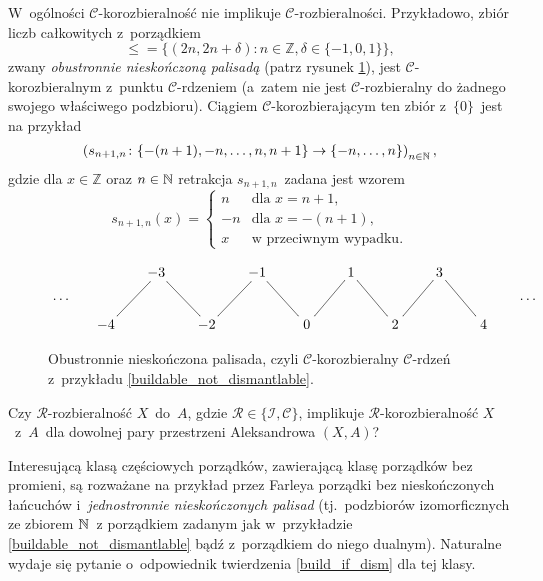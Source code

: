 \begin{ex}\label{buildable_not_dismantlable}
W~ogólności $\mathcal{C}$-korozbieralność nie implikuje $\mathcal{C}$-rozbieralności. Przykładowo, zbiór liczb całkowitych z~porządkiem \[\leq=\{(2n,2n+\delta):n\in\mathbb{Z},\delta\in\{-1,0,1\}\},\]
zwany \textit{obustronnie nieskończoną palisadą} (patrz rysunek \ref{fig-palisada}), jest $\mathcal{C}$-korozbieralnym z~punktu $\mathcal{C}$-rdzeniem (a~zatem nie jest $\mathcal{C}$-rozbieralny do żadnego swojego właściwego podzbioru). Ciągiem $\mathcal{C}$-korozbierającym ten zbiór z~$\{0\}$~jest na przykład \[\left(s_{n+1,n}\colon \{-(n+1),-n,\ldots,n,n+1\}\to \{-n,\ldots,n\}\right)_{n\in\mathbb{N}},\] gdzie dla $x\in \mathbb{Z}$ oraz $n\in\mathbb{N}$ retrakcja $s_{n+1,n}$~zadana jest wzorem \[s_{n+1,n}(x)=\begin{cases}n & \text{dla } x=n+1,\\
-n & \text{dla } x=-(n+1),\\
x & \text{w przeciwnym wypadku}.\end{cases}\]
\end{ex}

\begin{figure}[h]
\centering
\[\xymatrix@R=7pt@C=14pt{& &-3\ \ar@{-}[ddl]\ar@{-}[ddr] & & -1\ \ar@{-}[ddl]\ar@{-}[ddr] & & \ 1\ \ar@{-}[ddl]\ar@{-}[ddr] & & \ 3\ \ar@{-}[ddl]\ar@{-}[ddr] \\ \cdots & & & & & & & & & & \cdots\\
& -4\  & & -2\  & & \ 0\  & & \ 2\ & & \ 4\ }\]
\caption{Obustronnie nieskończona palisada, czyli $\mathcal{C}$-korozbieralny $\mathcal{C}$-rdzeń z~przykładu \ref{buildable_not_dismantlable}.}\label{fig-palisada}
\end{figure}


\begin{problem}\label{prob1}
Czy $\mathcal{R}$-rozbieralność $X$~do~$A$, gdzie $\mathcal{R}\in\{\mathcal{I},\mathcal{C}\}$, implikuje \mbox{$\mathcal{R}$-korozbieralność} $X$~z~$A$~dla dowolnej pary przestrzeni Aleksandrowa $(X,A)$?
\end{problem}

Interesującą klasą częściowych porządków, zawierającą klasę porządków bez promieni, są rozważane na przykład przez Farleya \cite{Farley97} porządki bez nieskończonych łańcuchów i~\textit{jednostronnie nieskończonych palisad} (tj.~podzbiorów izomorficznych ze zbiorem $\mathbb{N}$~z porządkiem zadanym jak w~przykładzie \ref{buildable_not_dismantlable} bądź z~porządkiem do niego dualnym). Naturalne wydaje się pytanie o~odpowiednik twierdzenia \ref{build_if_dism} dla tej klasy.

